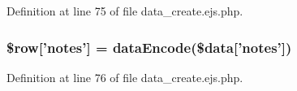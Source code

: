 \-Definition at line 75 of file data\-\_\-create.\-ejs.\-php.

\hypertarget{miscellaneous_2mysettings_2data__create_8ejs_8php_a6cd140f95df717cfed217fe478482645}{
\subsubsection[{\$row}]{\setlength{\rightskip}{0pt plus 5cm}\$row\mbox{[}'notes'\mbox{]} = {\bf data\-Encode}(\$data\mbox{[}'notes'\mbox{]})}}\label{miscellaneous_2mysettings_2data__create_8ejs_8php_a6cd140f95df717cfed217fe478482645}


\-Definition at line 76 of file data\-\_\-create.\-ejs.\-php.

